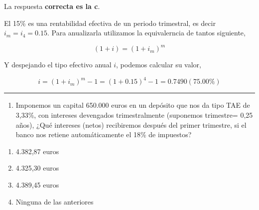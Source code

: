 \documentclass[
  letterpaper,
  DIV=11,
  numbers=noendperiod]{scrreprt}
\providecommand{\tightlist}{%
  \setlength{\itemsep}{0pt}\setlength{\parskip}{0pt}}\usepackage{longtable,booktabs,array}
\begin{document}
\begin{tcolorbox}[enhanced jigsaw, left=2mm, opacityback=0, colback=white, breakable, arc=.35mm, bottomrule=.15mm, rightrule=.15mm, toprule=.15mm, leftrule=.75mm, colframe=quarto-callout-tip-color-frame]
\begin{minipage}[t]{5.5mm}
\textcolor{quarto-callout-tip-color}{\faLightbulb}
\end{minipage}%
\begin{minipage}[t]{\textwidth - 5.5mm}

La respuesta \textbf{correcta es la c}.

El 15\% es una rentabilidad efectiva de un periodo trimestral, es decir
\(i_m=i_4=0.15\). Para anualizarla utilizamos la equivalerncia de tantos
siguiente,

\[(1+i)=(1+ i _m)^m\]

Y despejando el tipo efectivo anual \(i\), podemos calcular su valor,

\[i=(1+ i _m)^m-1=(1+0.15)^4-1=0.7490(75.00\%)\]

\end{minipage}%
\end{tcolorbox}

\begin{center}\rule{0.5\linewidth}{0.5pt}\end{center}

\begin{enumerate}
\def\labelenumi{\arabic{enumi}.}
\setcounter{enumi}{15}
\tightlist
\item
  Imponemos un capital 650.000 euros en un depósito que nos da tipo TAE
  de 3,33\%, con intereses devengados trimestralmente (suponemos
  trimestre= 0,25 años), ¿Qué intereses (netos) recibiremos después del
  primer trimestre, si el banco nos retiene automáticamente el 18\% de
  impuestos?
\end{enumerate}

\begin{enumerate}
\def\labelenumi{\alph{enumi})}
\item
  4.382,87 euros
\item
  4.325,30 euros
\item
  4.389,45 euros
\item
  Ninguna de las anteriores
\end{enumerate}
\end{document}
